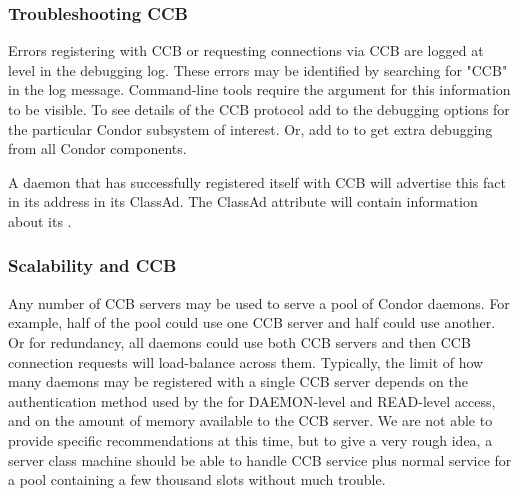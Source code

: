 \subsubsection{Troubleshooting CCB}

Errors registering with CCB or requesting connections via CCB are
logged at level  in the debugging log.
These errors may be identified by searching for "CCB" in the log message.
Command-line tools require the argument
 for this information to be visible.  To see details of
the CCB protocol add  to the debugging options for
the particular Condor subsystem of interest.
Or, add  to
 to get extra debugging from all Condor
components.

A daemon that has successfully registered itself with CCB will
advertise this fact in its address in its ClassAd.  
The ClassAd attribute  will contain information
about its .

\subsubsection{Scalability and CCB}

Any number of CCB servers may be used to serve a pool of Condor
daemons.  For example, half of the pool could use one CCB server and
half could use another.  Or for redundancy, all daemons could use both
CCB servers and then CCB connection requests will load-balance
across them.  Typically, the limit of how many daemons may be
registered with a single CCB server depends on the authentication
method used by the  for DAEMON-level and READ-level access,
and on the amount of memory available to the CCB server.  We are not
able to provide specific recommendations at this time, 
but to give a very rough idea,
a server class machine should be able to handle CCB
service plus normal  service for a pool containing
a few thousand slots without much trouble.

